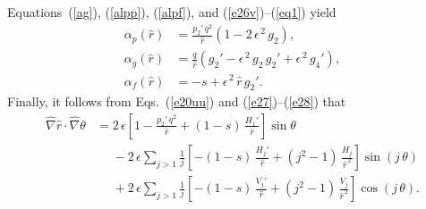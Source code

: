 \documentclass[12pt,prb,aps,notitlepage]{revtex4-1}
\begin{document}
Equations~(\ref{ag}), (\ref{alpp}), (\ref{alpf}), and (\ref{e26v})--(\ref{eq1}) yield
\begin{align}
\alpha_p(\hat{r}) &= \frac{p_2'\,q^2}{\hat{r}}\left(1-2\,\epsilon^{\,2}\,g_2\right),\\[0.5ex]
\alpha_g(\hat{r}) &= \frac{q}{\hat{r}}\left(g_2' -\epsilon^{\,2}\,g_2\,g_2'+\epsilon^{\,2}\,g_4'\right),\\[0.5ex]
\alpha_f(\hat{r}) &= -s + \epsilon^{\,2}\,\hat{r}\,g_2'.
\end{align}
Finally, it follows from Eqs.~(\ref{e20uu}) and (\ref{e27})--(\ref{e28}) that
\begin{align}\label{e114}
\hat{\nabla}\hat{r}\cdot\hat{\nabla}\theta &= 2\,\epsilon\left[1-\frac{p_2'\,q^2}{\hat{r}} +(1-s)\,\frac{H_1'}{\hat{r}}\right]\sin\theta\nonumber\\[0.5ex]
&\phantom{=}-2\,\epsilon\sum_{j>1}\frac{1}{j}\left[-(1-s)\,\frac{H_j'}{\hat{r}} + (j^2-1)\,\frac{H_j}{\hat{r}^{\,2}}\right]\sin(j\,\theta)\nonumber\\[0.5ex]
&\phantom{=}+2\,\epsilon\sum_{j>1}\frac{1}{j}\left[-(1-s)\,\frac{V_j'}{\hat{r}} + (j^2-1)\,\frac{V_j}{\hat{r}^{\,2}}\right]\cos(j\,\theta).
\end{align}
\end{document}
